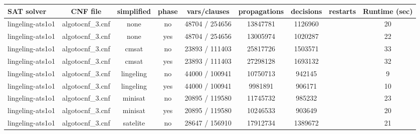 \begin{appendices}
\begin{table}[p]
  \begin{center}
    \begin{tabular}{l|cccccccc}
        \textbf{SAT solver} & \textbf{CNF file} & \textbf{simplified} & \textbf{phase} & \textbf{vars/clauses} & \textbf{propagations} & \textbf{decisions} & \textbf{restarts} & \textbf{Runtime (sec)} \\
      \hline
  lingeling-ats1o1               & algotocnf\_3.cnf               & none       & no    & 48704 / 254656 & 13847781  & 1126960   &            & 20 \\ %
  lingeling-ats1o1               & algotocnf\_3.cnf               & none       & yes   & 48704 / 254656 & 13005974  & 1020287   &            & 22 \\ %
  lingeling-ats1o1               & algotocnf\_3.cnf               & cmsat      & no    & 23893 / 111403 & 25817726  & 1503571   &            & 33 \\ %
  lingeling-ats1o1               & algotocnf\_3.cnf               & cmsat      & yes   & 23893 / 111403 & 27298128  & 1693132   &            & 32 \\ %
  lingeling-ats1o1               & algotocnf\_3.cnf               & lingeling  & no    & 44000 / 100941 & 10750713  & 942145    &            & 9 \\ %
  lingeling-ats1o1               & algotocnf\_3.cnf               & lingeling  & yes   & 44000 / 100941 & 9981891   & 906171    &            & 10 \\ %
  lingeling-ats1o1               & algotocnf\_3.cnf               & minisat    & no    & 20895 / 119580 & 11745732  & 985232    &            & 23 \\ %
  lingeling-ats1o1               & algotocnf\_3.cnf               & minisat    & yes   & 20895 / 119580 & 10246533  & 903649    &            & 20 \\ %
  lingeling-ats1o1               & algotocnf\_3.cnf               & satelite   & no    & 28647 / 156910 & 17912734  & 1389672   &            & 21 \\ %

\end{tabular}
\end{center}
\end{table}
\end{appendices}
